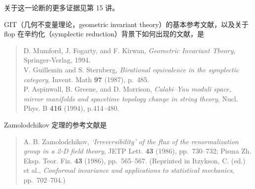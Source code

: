 关于这一论断的更多证据见第 15 讲。

GIT（几何不变量理论，geometric invariant theory）的基本参考文献，以及关于 flop 在辛约化（symplectic reduction）背景下如何出现的文献，是
\begin{quote}
D. Mumford, J. Fogarty, and F. Kirwan, \emph{Geometric Invariant Theory}, Springer-Verlag, 1994.\\
V. Guillemin and S. Sternberg, \emph{Birational equivalence in the symplectic category}, Invent. Math \textbf{97} (1987), p.~485.\\
P. Aspinwall, B. Greene, and D. Morrison, \emph{Calabi--Yau moduli space, mirror manifolds and spacetime topology change in string theory}, Nucl. Phys. B \textbf{416} (1994), p.414--480.
\end{quote}

Zamolodchikov 定理的参考文献是
\begin{quote}
A. B. Zamolodchikov, \emph{`Irreversibility' of the flux of the renormalization group in a 2-D field theory}, JETP Lett. \textbf{43} (1986), pp.~730--732; Pisma Zh. Eksp. Teor. Fiz. \textbf{43} (1986), pp.~565--567. (Reprinted in Itzykson, C. (ed.) et al., \emph{Conformal invariance and applications to statistical mechanics}, pp.~702--704.)
\end{quote}

